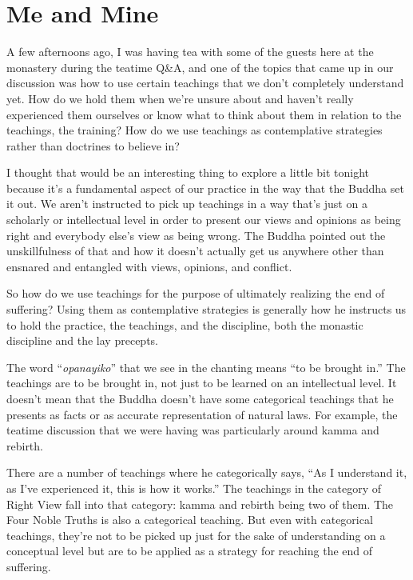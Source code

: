
\chapter{Me and Mine}


A few afternoons ago, I was having tea with some of the guests here at the monastery during the teatime Q\&A, and one of the topics that came up in our discussion was how to use certain teachings that we don't completely understand yet. How do we hold them when we're unsure about and haven't really experienced them ourselves or know what to think about them in relation to the teachings, the training? How do we use teachings as contemplative strategies rather than doctrines to believe in?

I thought that would be an interesting thing to explore a little bit tonight because it's a fundamental aspect of our practice in the way that the Buddha set it out. We aren't instructed to pick up teachings in a way that's just on a scholarly or intellectual level in order to present our views and opinions as being right and everybody else's view as being wrong. The Buddha pointed out the unskillfulness of that and how it doesn't actually get us anywhere other than ensnared and entangled with views, opinions, and conflict.

So how do we use teachings for the purpose of ultimately realizing the end of suffering? Using them as contemplative strategies is generally how he instructs us to hold the practice, the teachings, and the discipline, both the monastic discipline and the lay precepts.

The word ``\emph{opanayiko}'' that we see in the chanting means ``to be brought in.'' The teachings are to be brought in, not just to be learned on an intellectual level. It doesn't mean that the Buddha doesn't have some categorical teachings that he presents as facts or as accurate representation of natural laws. For example, the teatime discussion that we were having was particularly around kamma and rebirth.

There are a number of teachings where he categorically says, ``As I understand it, as I've experienced it, this is how it works.'' The teachings in the category of Right View fall into that category: kamma and rebirth being two of them. The Four Noble Truths is also a categorical teaching. But even with categorical teachings, they're not to be picked up just for the sake of understanding on a conceptual level but are to be applied as a strategy for reaching the end of suffering.

